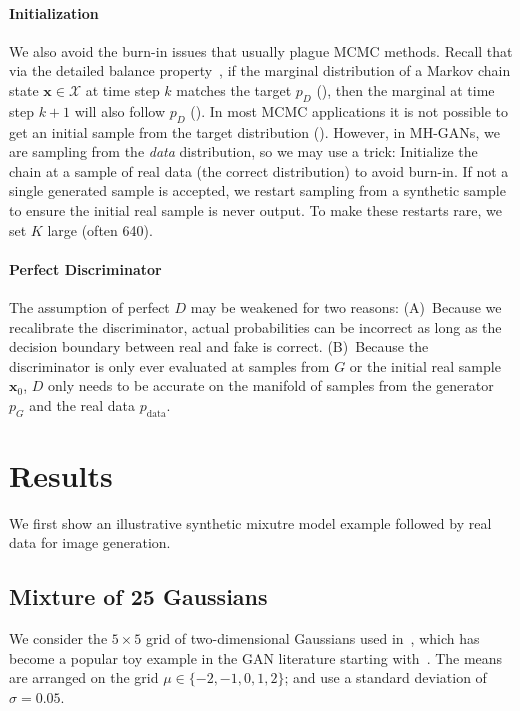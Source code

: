 \documentclass{article}
\renewcommand{\vec}[1]{{\boldsymbol{\mathbf{#1}}}} %
\newcommand{\set}[1]{\mathcal{#1}}
\newcommand{\sample}{\sim}
\newcommand{\PG}{{p_G}}
\newcommand{\PD}{{p_D}}
\newcommand{\PR}{{p_{\textrm{data}}}}
\newcommand{\setx}{\set{X}}
\begin{document}
\paragraph{Initialization}
We also avoid the burn-in issues that usually plague MCMC methods.
Recall that via the detailed balance property~\citep[Ch.~1]{Gilks1996}, if the marginal distribution of a Markov chain state $\vec x \in \setx$ at time step $k$ matches the target $\PD$ (\smash{$\vec x_k \sample \PD$}), then the marginal at time step $k+1$ will also follow $\PD$ (\smash{$\vec x_{k+1} \sample \PD$})\@.
In most MCMC applications it is not possible to get an initial sample from the target distribution (\smash{$\vec x_0 \sample \PD$})\@.
However, in MH-GANs, we are sampling from the \emph{data} distribution, so we may use a trick:
Initialize the chain at a sample of real data (the correct distribution) to avoid burn-in.
If not a single generated sample is accepted, we restart sampling from a synthetic sample to ensure the initial real sample is never output.
To make these restarts rare, we set $K$ large (often 640)\@.

\paragraph{Perfect Discriminator}
The assumption of perfect $D$ may be weakened for two reasons:
(A)~Because we recalibrate the discriminator, actual probabilities can be incorrect as long as the decision boundary between real and fake is correct.
(B)~Because the discriminator is only ever evaluated at samples from $G$ or the initial real sample $\vec x_0$, $D$ only needs to be accurate on the manifold of samples from the generator $\PG$ and the real data $\PR$.



\section{Results}
\label{sec:Results}

We first show an illustrative synthetic mixutre model example followed by real data for image generation.

\subsection{Mixture of 25 Gaussians}

We consider the $5 \times 5$ grid of two-dimensional Gaussians used in~\citet{Azadi2018}, which has become a popular toy example in the GAN literature starting with~\citet{Dumoulin2016}.
The means are arranged on the grid $\mu \in \{{-2},{-1},0,1,2\}$; and use a standard deviation of $\sigma = 0.05$.
\end{document}
